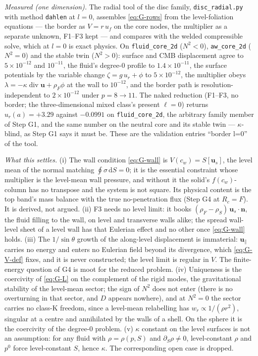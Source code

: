 \documentclass[11pt]{article}
\newcommand{\bu}{\mathbf{u}}
\newcommand{\bn}{\mathbf{n}}
\newcommand{\dS}{\,\mathrm{d}S}
\newcommand{\Div}{\operatorname{div}}
\newcommand{\code}[1]{\texttt{#1}}
\begin{document}
\emph{Measured (one dimension).} The radial tool of the disc family,
\code{disc\_radial.py} with method \code{dahlen} at $l = 0$, assembles \eqref{eq:G-rows} from the level-foliation
equations --- the border as $V = r\,u_f$ on the core nodes, the
multiplier as a separate unknown, F1--F3 kept --- and compares with the
welded compressible solve, which at $l = 0$ is exact physics. On
\code{fluid\_core\_2d} ($N^2 < 0$), \code{aw\_core\_2d} ($N^2 = 0$)
and the stable twin ($N^2 > 0$): surface and CMB displacement agree to
$5\times10^{-12}$ and $10^{-11}$, the fluid's degree-0 profile to
$1.4\times10^{-11}$, the surface potentials by the variable change
$\zeta = g\,u_r + \phi$ to $5\times10^{-12}$, the multiplier obeys
$\lambda = -\kappa\Div\bu + \rho_F\phi$ at the wall to $10^{-12}$, and
the border path is resolution-independent to $2\times10^{-12}$ under
$p = 8 \to 11$. The naked reduction (F1--F3, no border; the
three-dimensional mixed class's present $\ell = 0$) returns
$u_r(a) = +3.29$ against $-0.0991$ on \code{fluid\_core\_2d}, the
arbitrary family member of Step G1, and the same number on the neutral
core and its stable twin --- $\kappa$-blind, as Step G1 says it must be.
These are the validation entries ``border l=0'' of the tool.

\emph{What this settles.} (i) The wall condition \eqref{eq:G-wall} is
$V(c_w) = S[\bu_s]$, the level mean of the normal matching
$\oint\sigma\dS = 0$; it is the essential constraint whose multiplier is
the level-mean wall pressure, and without it the solid's
$f(c_w)$-column has no transpose and the system is not square. Its
physical content is the top band's mass balance with the true
no-penetration flux (Step G4 at $R_c = F$). It is derived, not argued.
(ii) F3 needs no level limit: it books $(\rho_F - \rho_S)\,\bu_s\cdot\bn$,
the fluid filling to the wall, on level and transverse walls alike;
the spread wall-level sheet of a level wall has that Eulerian effect
and no other once \eqref{eq:G-wall} holds. (iii) The $1/\sin\theta$
growth of the along-level displacement is immaterial: $\bu_\parallel$
carries no energy and enters no Eulerian field beyond its divergence,
which \eqref{eq:G-V-def} fixes, and it is never constructed; the level
limit is regular in $V$. The finite-energy question of G4 is moot for
the reduced problem. (iv) Uniqueness is the coercivity of \eqref{eq:G-L}
on the complement of the rigid modes, the gravitational stability of
the level-mean sector; the sign of $N^2$ does not enter (there is no
overturning in that sector, and $D$ appears nowhere), and at $N^2 = 0$
the sector carries no class-K freedom, since a level-mean relabelling
has $w_r \propto 1/(\rho r^2)$, singular at a centre and annihilated by
the walls of a shell. On the sphere it is the coercivity of the degree-0
problem. (v) $\kappa$ constant on the level surfaces is not an
assumption: for any fluid with $\rho = \rho(p, S)$ and $\partial_S\rho
\neq 0$, level-constant $\rho$ and $p^0$ force level-constant $S$, hence
$\kappa$. The corresponding open case is dropped.
\end{document}
